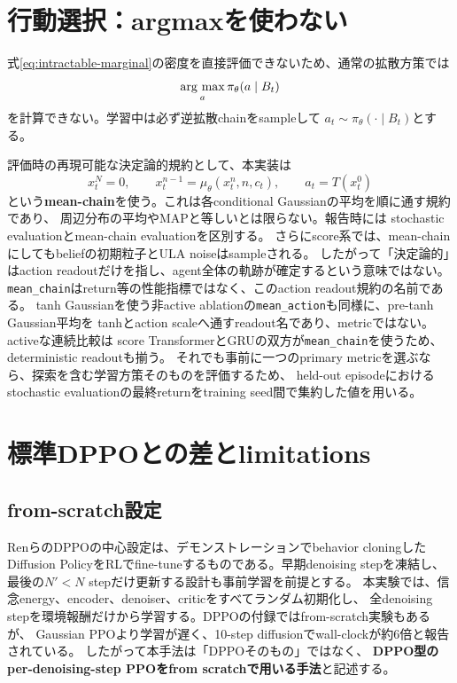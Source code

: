 \documentclass[a4paper,11pt]{article}
\begin{document}
\section{行動選択：argmaxを使わない}

式\eqref{eq:intractable-marginal}の密度を直接評価できないため、通常の拡散方策では
\begin{equation}
  \mathop{\rm arg~max}\limits_a\pi_\theta(a\mid B_t)
  \label{eq:invalid-argmax}
\end{equation}
を計算できない。学習中は必ず逆拡散chainをsampleして
$a_t\sim\pi_\theta(\cdot\mid B_t)$とする。

評価時の再現可能な決定論的規約として、本実装は
\begin{equation}
  x_t^N=0,\qquad
  x_t^{n-1}=\mu_\theta(x_t^n,n,c_t),\qquad
  a_t=T(x_t^0)
  \label{eq:mean-chain}
\end{equation}
という\textbf{mean-chain}を使う。これは各conditional Gaussianの平均を順に通す規約であり、
周辺分布の平均やMAPと等しいとは限らない。報告時には
stochastic evaluationとmean-chain evaluationを区別する。
さらにscore系では、mean-chainにしてもbeliefの初期粒子とULA noiseはsampleされる。
したがって「決定論的」はaction readoutだけを指し、agent全体の軌跡が確定するという意味ではない。
\texttt{mean\_chain}はreturn等の性能指標ではなく、このaction readout規約の名前である。
tanh Gaussianを使う非active ablationの\texttt{mean\_action}も同様に、pre-tanh Gaussian平均を
tanhとaction scaleへ通すreadout名であり、metricではない。activeな連続比較は
score TransformerとGRUの双方が\texttt{mean\_chain}を使うため、deterministic readoutも揃う。
それでも事前に一つのprimary metricを選ぶなら、探索を含む学習方策そのものを評価するため、
held-out episodeにおけるstochastic evaluationの最終returnをtraining seed間で集約した値を用いる。

\section{標準DPPOとの差とlimitations}

\subsection{from-scratch設定}

RenらのDPPO\cite{ren2025dppo}の中心設定は、デモンストレーションでbehavior cloningした
Diffusion PolicyをRLでfine-tuneするものである。早期denoising stepを凍結し、
最後の$N'<N$ stepだけ更新する設計も事前学習を前提とする。
本実験では、信念energy、encoder、denoiser、criticをすべてランダム初期化し、
全denoising stepを環境報酬だけから学習する。DPPOの付録ではfrom-scratch実験もあるが、
Gaussian PPOより学習が遅く、10-step diffusionでwall-clockが約6倍と報告されている。
したがって本手法は「DPPOそのもの」ではなく、
\textbf{DPPO型のper-denoising-step PPOをfrom scratchで用いる手法}と記述する。
\end{document}
